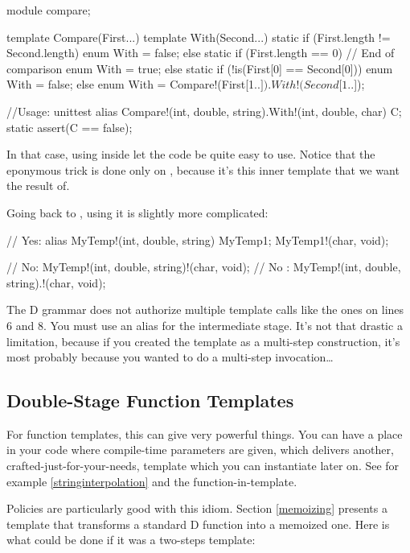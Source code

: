 \begin{dcode}
module compare;

template Compare(First...)
{
    template With(Second...)
    {
        static if (First.length != Second.length)
            enum With = false;
        else static if (First.length == 0) // End of comparison
            enum With = true;
        else static if (!is(First[0] == Second[0]))
            enum With = false;
        else
            enum With = Compare!(First[1..$]).With!(Second[1..$]);
    }
}

//Usage:
unittest
{
    alias Compare!(int, double, string).With!(int, double, char) C;
    static assert(C == false);
}
\end{dcode}

In that case, using  inside  let the code be quite easy to use. Notice that the eponymous trick is done only on , because it's this inner template that we want the result of.

Going back to , using it is slightly more complicated:

\begin{ndcode}
// Yes:
alias MyTemp!(int, double, string) MyTemp1;
MyTemp1!(char, void);

// No:
MyTemp!(int, double, string)!(char, void);
// No :
MyTemp!(int, double, string).!(char, void);
\end{ndcode}

The D grammar does not authorize multiple template calls like the ones on lines 6 and 8. You must use an alias for the intermediate stage. It's not that drastic a limitation, because if you created the template as a multi-step construction, it's most probably because you wanted to do a multi-step invocation\ldots

\subsection{Double-Stage Function Templates}

For function templates, this can give very powerful things. You can have a place in your code where compile-time parameters are given, which delivers another, crafted-just-for-your-needs, template which you can instantiate later on. See for example \ref{stringinterpolation} and the  function-in-template.

Policies are particularly good with this idiom. Section \ref{memoizing} presents a template that transforms a standard D function into a memoized one. Here is what could be done if it was a two-steps template:

